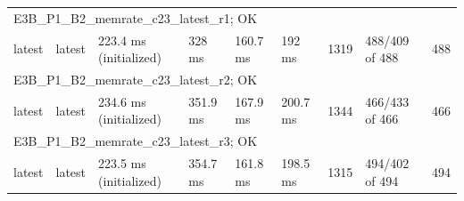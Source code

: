 \begin{tabular}{lllllllll}
\multicolumn{9}{l}{E3B\_P1\_B2\_memrate\_c23\_latest\_r1; OK} \\
latest & latest & 223.4 ms (initialized) & 328 ms & 160.7 ms & 192 ms & 1319 & 488/409 of 488 & 488 \\
\multicolumn{9}{l}{E3B\_P1\_B2\_memrate\_c23\_latest\_r2; OK} \\
latest & latest & 234.6 ms (initialized) & 351.9 ms & 167.9 ms & 200.7 ms & 1344 & 466/433 of 466 & 466 \\
\multicolumn{9}{l}{E3B\_P1\_B2\_memrate\_c23\_latest\_r3; OK} \\
latest & latest & 223.5 ms (initialized) & 354.7 ms & 161.8 ms & 198.5 ms & 1315 & 494/402 of 494 & 494 \\
\bottomrule
\end{tabular}
